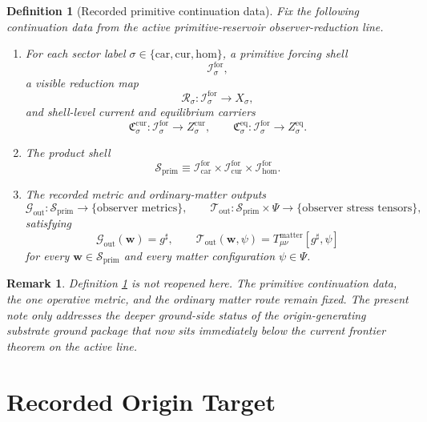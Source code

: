 \documentclass[11pt]{article}
\newcommand{\CompletedMetric}{g^{\sharp}}
\newcommand{\Car}{\mathrm{car}}
\newcommand{\Cur}{\mathrm{cur}}
\newcommand{\Hom}{\mathrm{hom}}
\newcommand{\ForSpace}[1]{\mathcal I_{#1}^{\mathrm{for}}}
\newcommand{\PrimShell}{\mathcal S_{\mathrm{prim}}}
\newcommand{\Reduction}[1]{\mathcal R_{#1}}
\newcommand{\CurrentCarrier}[1]{\mathfrak C_{#1}^{\mathrm{cur}}}
\newcommand{\EqCarrier}[1]{\mathfrak C_{#1}^{\mathrm{eq}}}
\newcommand{\MetricOut}{\mathscr G_{\mathrm{out}}}
\newcommand{\MatterOut}{\mathscr T_{\mathrm{out}}}
\newtheorem{definition}{Definition}
\newtheorem{remark}{Remark}
\begin{document}
\begin{definition}[Recorded primitive continuation data]
\label{def:fixed}
Fix the following continuation data from the active primitive-reservoir observer-reduction line.
\begin{enumerate}
    \item For each sector label \(\sigma\in\{\Car,\Cur,\Hom\}\), a primitive forcing shell
    \[
    \ForSpace{\sigma},
    \]
    a visible reduction map
    \[
    \Reduction{\sigma}:\ForSpace{\sigma}\to X_{\sigma},
    \]
    and shell-level current and equilibrium carriers
    \[
    \CurrentCarrier{\sigma}:\ForSpace{\sigma}\to Z_{\sigma}^{\mathrm{cur}},
    \qquad
    \EqCarrier{\sigma}:\ForSpace{\sigma}\to Z_{\sigma}^{\mathrm{eq}}.
    \]
    \item The product shell
    \[
    \PrimShell
    \equiv
    \ForSpace{\Car}\times \ForSpace{\Cur}\times \ForSpace{\Hom}.
    \]
    \item The recorded metric and ordinary-matter outputs
    \[
    \MetricOut:\PrimShell\to\{\text{observer metrics}\},
    \qquad
    \MatterOut:\PrimShell\times\Psi\to\{\text{observer stress tensors}\},
    \]
    satisfying
    \begin{equation}
    \MetricOut(\mathbf w)=\CompletedMetric,
    \qquad
    \MatterOut(\mathbf w,\psi)
    =
    T_{\mu\nu}^{\mathrm{matter}}[\CompletedMetric,\psi]
    \label{eq:fixedoutputs}
    \end{equation}
    for every \(\mathbf w\in\PrimShell\) and every matter configuration \(\psi\in\Psi\).
\end{enumerate}
\end{definition}

\begin{remark}
Definition \ref{def:fixed} is not reopened here. The primitive continuation data, the one operative metric, and the ordinary matter route remain fixed. The present note only addresses the deeper ground-side status of the origin-generating substrate ground package that now sits immediately below the current frontier theorem on the active line.
\end{remark}

\section{Recorded Origin Target}
\end{document}
